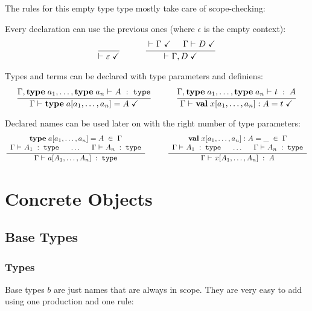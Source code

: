 The rules for this empty type type mostly take care of scope-checking:
\begin{compactitem}
\item Every declaration can use the previous ones (where $\epsilon$ is the empty context):
\[\rul{}{\iscont{}{\epsilon}}
\tb\tb
\rul{\iscont{}{\Gamma} \tb \isdecl{}{\Gamma}{D}}{\iscont{}{\Gamma,D}}
\]

\item Types and terms can be declared with type parameters and definiens:
\[
\rul{\oftype{}{\Gamma,\atypedef{a_1}{},\ldots,\atypedef{a_n}{}}{A}{\type}}{\isdecl{}{\Gamma}{\atypedef{a[a_1,\ldots,a_n]}{A}}}
\tb\tb
\rul{\oftype{}{\Gamma,\atypedef{a_1}{},\ldots,\atypedef{a_n}{}}{t}{A}}{\isdecl{}{\Gamma}{\aval{x[a_1,\ldots,a_n]}{A}{t}}}
\]
\item Declared names can be used later on with the right number of type parameters:
\[\rul{\begin{array}{c}
         \atypedef{a[a_1,\ldots,a_n]}{A}\;\in\; \Gamma \\
         \oftype{}{\Gamma}{A_1}{\type}\tb\ldots\tb \oftype{}{\Gamma}{A_n}{\type}
      \end{array}}
      {\oftype{}{\Gamma}{a[A_1,\ldots,A_n]}{\type}} \tb\tb
\rul{\begin{array}{c}
       \aval{x[a_1,\ldots,a_n]}{A}{\_}\;\in\; \Gamma \\
       \oftype{}{\Gamma}{A_1}{\type}\tb\ldots\tb \oftype{}{\Gamma}{A_n}{\type}
    \end{array}}
    {\oftype{}{\Gamma}{x[A_1,\ldots,A_n]}{A}}\]
\end{compactitem}

\section{Concrete Objects}\label{sec:sd:typetheory:objects}

\subsection{Base Types}

\subsubsection{Types}

Base types $b$ are just names that are always in scope.
They are very easy to add using one production and one rule:

